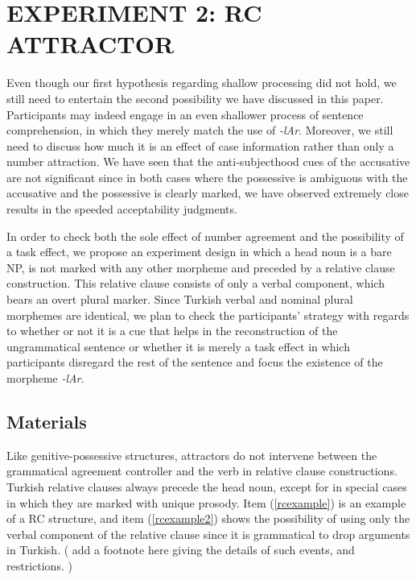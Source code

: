 \documentclass[11pt,a4paper]{article}
\begin{document}
\hypertarget{experiment-2-rc-attractor}{%
\section{EXPERIMENT 2: RC ATTRACTOR}\label{experiment-2-rc-attractor}}

Even though our first hypothesis regarding shallow processing did not
hold, we still need to entertain the second possibility we have
discussed in this paper. Participants may indeed engage in an even
shallower process of sentence comprehension, in which they merely match
the use of \emph{-lAr}. Moreover, we still need to discuss how much it
is an effect of case information rather than only a number attraction.
We have seen that the anti-subjecthood cues of the accusative are not
significant since in both cases where the possessive is ambiguous with
the accusative and the possessive is clearly marked, we have observed
extremely close results in the speeded acceptability judgments.

In order to check both the sole effect of number agreement and the
possibility of a task effect, we propose an experiment design in which a
head noun is a bare NP, is not marked with any other morpheme and
preceded by a relative clause construction. This relative clause
consists of only a verbal component, which bears an overt plural marker.
Since Turkish verbal and nominal plural morphemes are identical, we plan
to check the participants' strategy with regards to whether or not it is
a cue that helps in the reconstruction of the ungrammatical sentence or
whether it is merely a task effect in which participants disregard the
rest of the sentence and focus the existence of the morpheme
\emph{-lAr}.

\hypertarget{materials}{%
\subsection{Materials}\label{materials}}

Like genitive-possessive structures, attractors do not intervene between
the grammatical agreement controller and the verb in relative clause
constructions. Turkish relative clauses always precede the head noun,
except for in special cases in which they are marked with unique
prosody. Item (\ref{rcexample}) is an example of a RC structure, and
item (\ref{rcexample2}) shows the possibility of using only the verbal
component of the relative clause since it is grammatical to drop
arguments in Turkish. ( add a footnote here giving the details of such
events, and restrictions. )
\end{document}
